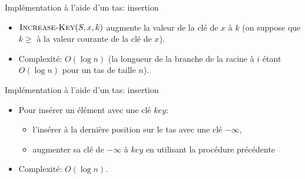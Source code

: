 \begin{frame}{Implémentation à l'aide d'un tas: insertion}
\begin{itemize}
\item $\textnormal{\scshape Increase-Key}(S,x,k)$ augmente la valeur de la clé de $x$
  à $k$ (on suppose que $k\geq$ à la valeur courante de la clé de $x$).

\bigskip

\begin{center}
\begin{small}
\end{small}
\end{center}

\bigskip

\item Complexité: $O(\log n)$ (la longueur de la branche de la racine à $i$ étant $O(\log n)$ pour un tas de taille $n$).
\end{itemize}
\end{frame}

\begin{frame}{Implémentation à l'aide d'un tas: insertion}
\begin{itemize}
\item Pour insérer un élément avec une clé $key$:
\begin{itemize}
\item l'insérer à la dernière position sur le tas avec une clé $-\infty$,
\item augmenter sa clé de $-\infty$ à $key$ en utilisant la procédure précédente
\end{itemize}

\bigskip

\begin{center}
\begin{small}
\end{small}
\end{center}

\bigskip

\item Complexité: $O(\log n)$.
\end{itemize}
\note{}
\end{frame}

